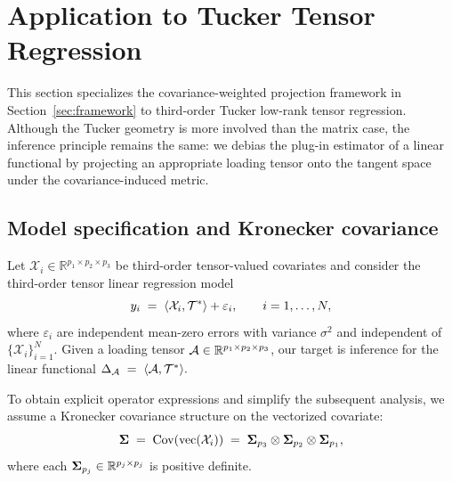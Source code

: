 \documentclass[authoryear,preprint,review,12pt]{elsarticle}
\begin{document}
	\section{Application to Tucker Tensor Regression}
	\label{sec:tucker}
	
This section specializes the covariance-weighted projection framework in Section~\ref{sec:framework}
	to third-order Tucker low-rank tensor regression. Although the Tucker geometry is more involved than the matrix case,
	the inference principle remains the same: we debias the plug-in estimator of a linear functional by
	projecting an appropriate loading tensor onto the tangent space under the covariance-induced metric.
	
	\subsection{Model specification and Kronecker covariance}
	\label{subsec:tucker:model}
	
	Let $\mathcal{X}_i \in \mathbb{R}^{p_1\times p_2\times p_3}$ be third-order tensor-valued covariates and consider
	the third-order tensor linear regression model
	\begin{equation}
		y_i \;=\; \langle \mathcal{X}_i, \mathcal{T}^\ast \rangle + \varepsilon_i,
		\qquad i=1,\ldots,N,
		\label{eq:tucker:model}
	\end{equation}
	where $\varepsilon_i$ are independent mean-zero errors with variance $\sigma^2$ and independent of
	$\{\mathcal{X}_i\}_{i=1}^N$.
	Given a loading tensor $\mathcal{A}\in\mathbb{R}^{p_1\times p_2\times p_3}$, our target is inference for
	the linear functional $\Delta_{\mathcal{A}} \;=\; \langle \mathcal{A}, \mathcal{T}^\ast \rangle.$
	
	To obtain explicit operator expressions and simplify the subsequent analysis, we assume a Kronecker
	covariance structure on the vectorized covariate:
	\begin{equation}
		\mathbf{ \Sigma} \;=\; \mathrm{Cov}(\mathrm{vec}(\mathcal{X}_i))
		\;=\; \mathbf{ \Sigma}_{p_3}\otimes \mathbf{ \Sigma}_{p_2}\otimes \mathbf{ \Sigma}_{p_1},
		\label{eq:tucker:kronecker}
	\end{equation}
	where each $\mathbf{ \Sigma}_{p_j}\in\mathbb{R}^{p_j\times p_j}$ is positive definite.
	
\end{document}
